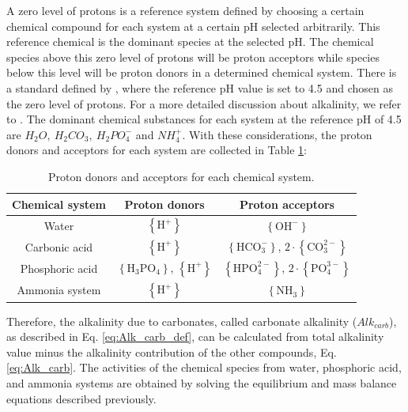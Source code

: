 \begin{refsection}[referencesCh3]
A zero level of protons is a reference system defined by choosing a certain chemical compound for each system at a certain pH selected arbitrarily. This reference chemical is the dominant species at the selected pH. The chemical species above this zero level of protons will be proton acceptors while species below this level will be proton donors in a determined chemical system. There is a standard defined by \citet{Dickson}, where the reference pH value is set to 4.5 and chosen as  the zero level of protons. For a more detailed discussion about alkalinity, we refer to \citet{WolfGladrow}.
The dominant chemical substances for each system at the reference pH of 4.5  are $H_{2}O, \ H_{2}CO_{3}, \ H_{2}PO_{4}^{-}$ and $NH_{4}^{+}$. With these considerations, the proton donors and acceptors for each system are collected in Table \ref{table:donors_and_aceptors}:
\begin{table}[h] 
	\begin{adjustwidth}{}{}
		\centering
		\caption{Proton donors and acceptors for each chemical system.} \label{table:donors_and_aceptors}
		\begin{tabular}{ c c c}
			\toprule
			Chemical system	& Proton donors	& Proton acceptors	\\ \midrule
			Water	& $\left\{ \text{H}^{+} \right\}$ & $\left\{ \text{OH}^{-} \right\}$	\\ 
			Carbonic acid	& $\left\{ \text{H}^{+} \right\}$ & $\left\{ \text{HCO}_{3}^{-} \right\}$, $2 \cdot \left\{\text{CO}_{3}^{2-}\right\}$	\\ 
			Phosphoric acid	& $\left\{ \text{H}_{3}\text{PO}_{4} \right\}$, $\left\{ \text{H}^{+} \right\}$ & $\left\{ \text{HPO}_{4}^{2-} \right\}$, $2 \cdot \left\{ \text{PO}_{4}^{3-} \right\}$	\\ 
			Ammonia system	& $\left\{ \text{H}^{+} \right\}$ & $\left\{ \text{NH}_{3} \right\}$	\\ \bottomrule
		\end{tabular}
	\end{adjustwidth}
\end{table}

\clearpage

Therefore, the alkalinity due to carbonates, called carbonate alkalinity ($Alk_{carb}$), as described in Eq. \ref{eq:Alk_carb_def}, can be calculated from total alkalinity value minus the alkalinity contribution of the other compounds, Eq. \ref{eq:Alk_carb}. The activities of the chemical species from water, phosphoric acid, and ammonia systems are obtained by solving the equilibrium and mass balance equations described previously.


\end{refsection}
